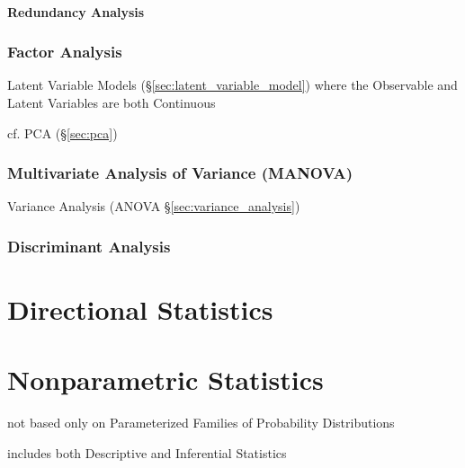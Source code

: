 \paragraph{Redundancy Analysis}\label{sec:redundancy_analysis}\hfill



\subsubsection{Factor Analysis}\label{sec:factor_analysis}

Latent Variable Models (\S\ref{sec:latent_variable_model}) where the Observable
and Latent Variables are both Continuous

cf. PCA (\S\ref{sec:pca})



\subsubsection{Multivariate Analysis of Variance (MANOVA)}\label{sec:manova}

Variance Analysis (ANOVA \S\ref{sec:variance_analysis})



\subsubsection{Discriminant Analysis}\label{sec:discriminant_analysis}



\section{Directional Statistics}\label{sec:directional_statistics}

\section{Nonparametric Statistics}\label{sec:nonparametric_statistics}

not based only on Parameterized Families of Probability Distributions

includes both Descriptive and Inferential Statistics

